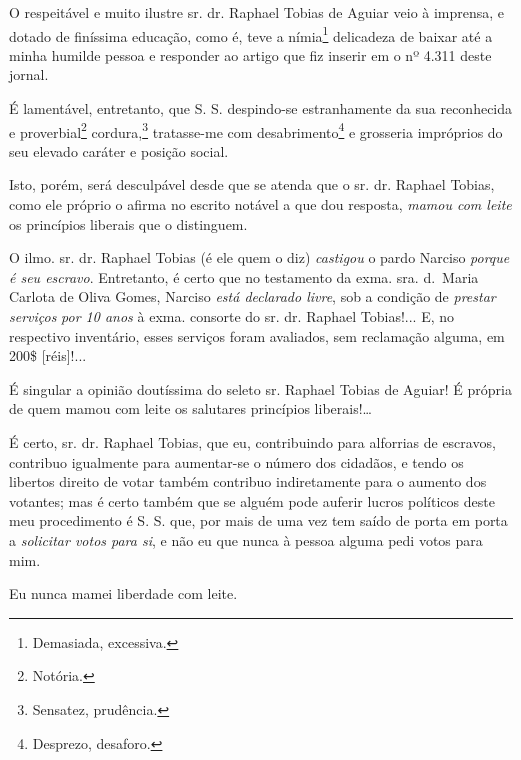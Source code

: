 {\asterisc{}

O respeitável e muito ilustre sr. dr. Raphael Tobias de Aguiar veio à
imprensa, e dotado de finíssima educação, como é, teve a
nímia\footnote{ Demasiada, excessiva.} delicadeza de baixar até a
minha humilde pessoa e responder ao artigo que fiz inserir em o nº 4.311
deste jornal.

É lamentável, entretanto, que S. S. despindo-se estranhamente da sua
reconhecida e proverbial\footnote{ Notória.} cordura,\footnote{
  Sensatez, prudência.} tratasse-me com desabrimento\footnote{
  Desprezo, desaforo.} e grosseria impróprios do seu elevado caráter e
posição social.

Isto, porém, será desculpável desde que se atenda que o sr. dr. Raphael
Tobias, como ele próprio o afirma no escrito notável a que dou resposta,
\emph{mamou com leite} os princípios liberais que o distinguem.

O ilmo. sr. dr. Raphael Tobias (é ele quem o diz) \emph{castigou} o
pardo Narciso \emph{porque é seu escravo}. Entretanto, é certo que no
testamento da exma. sra. d.~Maria Carlota de Oliva Gomes, Narciso
\emph{está declarado livre}, sob a condição de \emph{prestar serviços}
\emph{por 10 anos} à exma. consorte do sr. dr. Raphael Tobias!... E, no
respectivo inventário, esses serviços foram avaliados, sem reclamação
alguma, em 200\$ {[}réis{]}!...

É singular a opinião doutíssima do seleto sr. Raphael Tobias de Aguiar!
É própria de quem mamou com leite os salutares princípios
liberais!\ldots{}

É certo, sr. dr. Raphael Tobias, que eu, contribuindo para alforrias de
escravos, contribuo igualmente para aumentar-se o número dos cidadãos, e
tendo os libertos direito de votar também contribuo indiretamente para o
aumento dos votantes; mas é certo também que se alguém pode auferir
lucros políticos deste meu procedimento é S. S. que, por mais de uma vez
tem saído de porta em porta a \emph{solicitar votos para si}, e não eu
que nunca à pessoa alguma pedi votos para mim.

Eu nunca mamei liberdade com leite.

}
